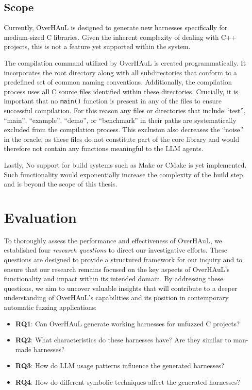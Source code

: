 \documentclass[
  a4paper,
  DIV=11,
  numbers=noendperiod]{scrreprt}
\theoremstyle{definition}
\theoremstyle{remark}
\begin{document}
\section{Scope}\label{sec-scope}

Currently, OverHAuL is designed to generate new harnesses specifically
for medium-sized C libraries. Given the inherent complexity of dealing
with C++ projects, this is not a feature yet supported within the
system.

The compilation command utilized by OverHAuL is created
programmatically. It incorporates the root directory along with all
subdirectories that conform to a predefined set of common naming
conventions. Additionally, the compilation process uses all C source
files identified within these directories. Crucially, it is important
that no \texttt{main()} function is present in any of the files to
ensure successful compilation. For this reason any files or directories
that include ``test'', ``main'', ``example'', ``demo'', or ``benchmark''
in their paths are systematically excluded from the compilation process.
This exclusion also decreases the ``noise'' in the oracle, as these
files do not constitute part of the core library and would therefore not
contain any functions meaningful to the LLM agents.

Lastly, No support for build systems such as Make or CMake
\autocite{cedilnik2000,feldman1979} is yet implemented. Such
functionality would exponentially increase the complexity of the build
step and is beyond the scope of this thesis.


\chapter{Evaluation}\label{evaluation}

To thoroughly assess the performance and effectiveness of OverHAuL, we
established four \emph{research questions} to direct our investigative
efforts. These questions are designed to provide a structured framework
for our inquiry and to ensure that our research remains focused on the
key aspects of OverHAuL's functionality and impact within its intended
domain. By addressing these questions, we aim to uncover valuable
insights that will contribute to a deeper understanding of OverHAuL's
capabilities and its position in contemporary automatic fuzzing
applications:

\begin{itemize}
\item
  \textbf{RQ1}: Can OverHAuL generate working harnesses for unfuzzed C
  projects?
\item
  \textbf{RQ2}: What characteristics do these harnesses have? Are they
  similar to man-made harnesses?
\item
  \textbf{RQ3}: How do LLM usage patterns influence the generated
  harnesses?
\item
  \textbf{RQ4}: How do different symbolic techniques affect the
  generated harnesses?
\end{itemize}
\end{document}
